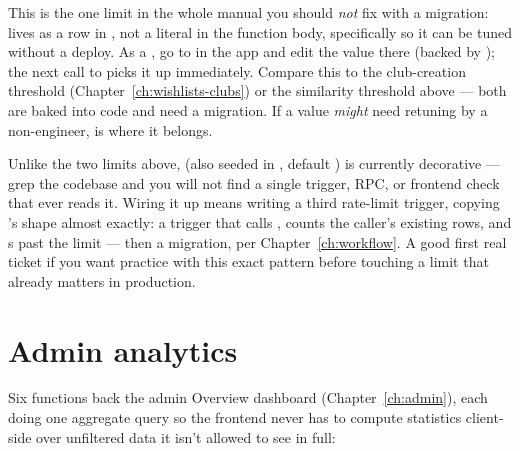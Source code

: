 \begin{olkhowto}
This is the one limit in the whole manual you should \emph{not} fix with a migration:  lives as a row in , not a literal in the function body, specifically so it can be tuned without a deploy. As a , go to  in the app and edit the value there (backed by ); the next call to  picks it up immediately. Compare this to the club-creation threshold (Chapter~\ref{ch:wishlists-clubs}) or the similarity threshold above — both are baked into code and need a migration. If a value \emph{might} need retuning by a non-engineer,  is where it belongs.
\end{olkhowto}

\begin{olkhowto}
Unlike the two limits above,  (also seeded in , default ) is currently decorative — grep the codebase and you will not find a single trigger, RPC, or frontend check that ever reads it. Wiring it up means writing a third rate-limit trigger, copying 's shape almost exactly: a  trigger that calls , counts the caller's existing  rows, and s past the limit — then a migration, per Chapter~\ref{ch:workflow}. A good first real ticket if you want practice with this exact pattern before touching a limit that already matters in production.
\end{olkhowto}

\section{Admin analytics}

Six  functions back the admin Overview dashboard (Chapter~\ref{ch:admin}), each doing one aggregate query so the frontend never has to compute statistics client-side over unfiltered data it isn't allowed to see in full:

